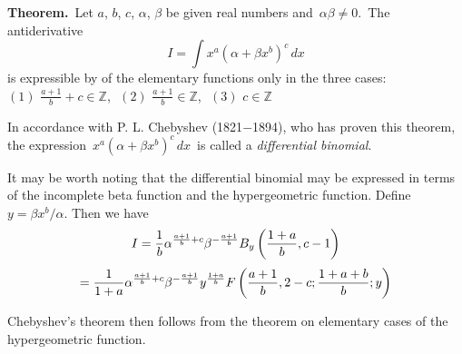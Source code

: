 \documentclass[12pt]{article}
\begin{document}
\textbf{Theorem.}\, Let $a$, $b$, $c$, $\alpha$, $\beta$ be given real numbers and \,$\alpha\beta \neq 0$. \,The antiderivative
$$I = \int x^a(\alpha+\beta x^b)^c\,dx$$
is expressible by  of the elementary functions only in the three cases: \,
$(1)\,\, \frac{a+1}{b}+c\in\mathbb{Z}$,\,\,
$(2)\,\, \frac{a+1}{b}\in\mathbb{Z}$,\,\,
$(3)\,\, c\in\mathbb{Z}$

In accordance with P. L. Chebyshev (1821$-$1894), who has proven this theorem, the expression \,$x^a(\alpha+\beta x^b)^c\,dx$\, is called a {\em differential binomial}.

It may be worth noting that the differential binomial may be expressed in terms of the incomplete beta function and the hypergeometric function.  Define $y = \beta x^b / \alpha$.  Then we have
 $$I = {1 \over b} \alpha^{{a + 1 \over b} + c} \beta^{-{a + 1 \over b}} B_y \left( {1 + a \over b}, c - 1 \right)$$
 $$= {1 \over 1 + a} \alpha^{{a + 1 \over b} + c} \beta^{-{a + 1 \over b}} y^{1 + a \over b} F \left( {a + 1 \over b}, 2-c; {1 + a + b \over b}; y \right)$$

Chebyshev's theorem then follows from the theorem on elementary cases of the hypergeometric function.
\end{document}
